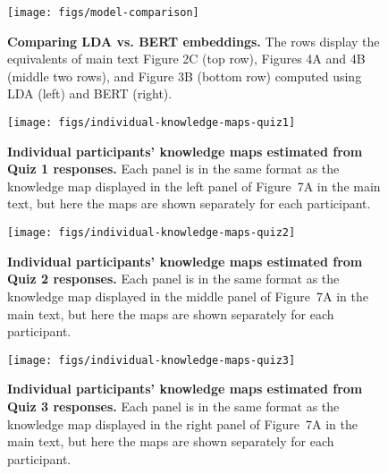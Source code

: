\documentclass[10pt]{article}
\newcommand{\knowledgeMaps}{7}
\begin{document}
\begin{figure}[tp]
    \centering
    \texttt{[image: figs/model-comparison]}

    \caption{\textbf{Comparing LDA vs. BERT embeddings.} The rows display the
    equivalents of main text Figure 2C (top row), Figures 4A and 4B (middle two
    rows), and Figure 3B (bottom row) computed using LDA (left) and BERT
    (right).}

    \label{fig:compare-bert}
\end{figure}



\newpage


\begin{figure}[tp]
    \centering
    \texttt{[image: figs/individual-knowledge-maps-quiz1]}
    
    \caption{\textbf{Individual participants' knowledge maps estimated from
    Quiz 1 responses.} Each panel is in the same format as the knowledge map
    displayed in the left panel of Figure~\knowledgeMaps A in the main text,
    but here the maps are shown separately for each participant.}
    
    \label{fig:knowledge-maps-q1}
\end{figure}


\begin{figure}[tp]
    \centering
    \texttt{[image: figs/individual-knowledge-maps-quiz2]}
    
    \caption{\textbf{Individual participants' knowledge maps estimated from
    Quiz 2 responses.} Each panel is in the same format as the knowledge map
    displayed in the middle panel of Figure~\knowledgeMaps A in the main text,
    but here the maps are shown separately for each participant.}
    
    \label{fig:knowledge-maps-q2}
\end{figure}


\begin{figure}[tp]
    \centering
    \texttt{[image: figs/individual-knowledge-maps-quiz3]}
    
    \caption{\textbf{Individual participants' knowledge maps estimated from
    Quiz 3 responses.} Each panel is in the same format as the knowledge map
    displayed in the right panel of Figure~\knowledgeMaps A in the main text,
    but here the maps are shown separately for each participant.}
    
    \label{fig:knowledge-maps-q3}
\end{figure}
\end{document}
